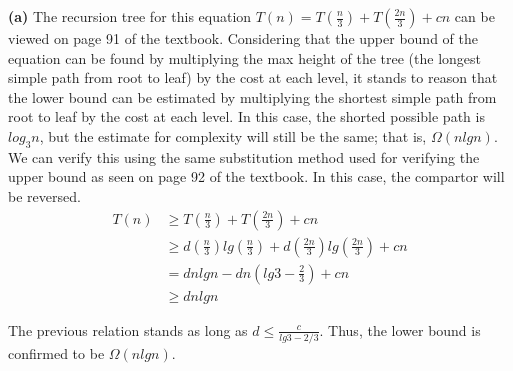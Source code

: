 \documentclass[11pt]{article}
\renewcommand\part[1]{\vspace{.10in}\textbf{(#1)}}
\begin{document}
\part{a}
The recursion tree for this equation $T(n) = T(\frac{n}{3}) + T(\frac{2n}{3}) + cn$ can be viewed on page 91 of the textbook. Considering that the upper bound of the equation can be found by multiplying the max height of the tree (the longest simple path from root to leaf) by the cost at each level, it stands to reason that the lower bound can be estimated by multiplying the shortest simple path from root to leaf by the cost at each level. In this case, the shorted possible path is $log_3n$, but the estimate for complexity will still be the same; that is, $\Omega(nlgn)$. We can verify this using the same substitution method used for verifying the upper bound as seen on page 92 of the textbook. In this case, the compartor will be reversed.
\begin{align*}
T(n) &\geq T(\frac{n}{3}) + T(\frac{2n}{3}) + cn \\
&\geq d(\frac{n}{3})lg(\frac{n}{3}) + d(\frac{2n}{3})lg(\frac{2n}{3}) +cn \\
&= dnlgn - dn(lg3 - \frac{2}{3}) + cn \\
&\geq dnlgn
\end{align*}

The previous relation stands as long as $d \leq \frac{c}{lg3 - 2/3}$. Thus, the lower bound is confirmed to be $\Omega(nlgn)$.
\end{document}
